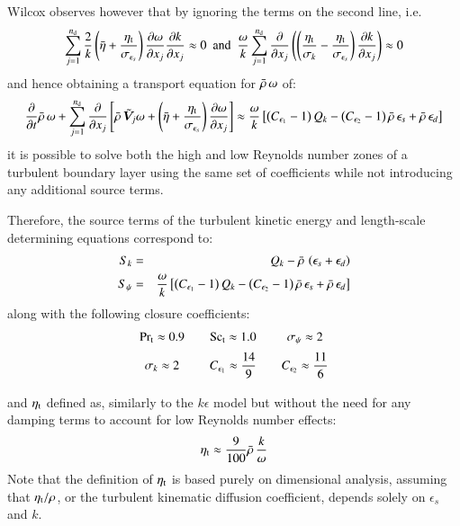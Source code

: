 \documentclass{warpdoc}
\newcommand{\alb}{\vspace{0.2cm}\\} %
\newcommand{\Sct}{{{\rm Sc}_{\rm t}}}
\newcommand{\Prt}{{{\rm Pr}_{\rm t}}}
\newcommand{\nd}{{{n}_{\rm d}}}
\newcommand{\turb}{_{\rm t}}
\newcommand{\etat}{{\eta\turb}}
\newcommand{\mfd}{\displaystyle}
\begin{document}
Wilcox\cite{turb:wilcox1988} observes however that by ignoring the terms on the second line,
i.e.
%
\begin{displaymath}
\sum_{j=1}^\nd \frac{2}{k}
\left(\wbar{\eta} +\frac{\etat}{\sigma_{\epsilon_s}} \right)
\frac{\partial \omega}{\partial x_j}    \frac{\partial k}{\partial x_j} \approx 0
{    \rm ~~and~~      }
   \mfd\frac{\omega}{k}
     \sum_{j=1}^{\nd} \frac{\partial }{\partial x_j}
     \left( \left( \frac{\etat}{\sigma_k}-\frac{\etat}{\sigma_{\epsilon_s}} \right) \frac{\partial k}{\partial x_j} \right) \approx 0
\end{displaymath}
%
and hence obtaining a transport equation for $\bar{\rho}\, \omega$ of:
%
\begin{equation}
    \frac{\partial }{\partial t}\wbar{\rho}\,\omega+\sum_{j=1}^\nd \frac{\partial}{\partial x_j}
            \left[
                \wbar{\rho}\, {\wtilde{\bm{V}}_j} \omega
               +\left( \wbar{\eta} +\frac{\etat}{\sigma_{\epsilon_s}} \right)\frac{\partial \omega}{\partial x_j}
            \right]
       \approx  \frac{\omega}{k}
         \left[
            \left(C_{\epsilon_1}-1\right) Q_k
           -\left(C_{\epsilon_2}-1\right) \wbar{\rho}\, \epsilon_s
           +\wbar{\rho}\, \epsilon_d
         \right]
  \label{eqn:SPDR:modeled:5}
\end{equation}
%
it is possible to solve both the high and low Reynolds number
zones of a turbulent boundary layer using the same set of
coefficients while not introducing any additional source terms.

Therefore, the source terms of the turbulent kinetic energy and length-scale
determining equations correspond to:
%
\begin{eqnarray}
  S_k&=&Q_k - \wbar{\rho}\, \left( \epsilon_s+\epsilon_d \right) \alb
  S_\psi&=&\frac{\omega}{k}
         \left[
            \left(C_{\epsilon_1}-1\right) Q_k
           -\left(C_{\epsilon_2}-1\right) \wbar{\rho}\, \epsilon_s
           +\wbar{\rho}\, \epsilon_d
         \right]
\end{eqnarray}
%
along with the following closure coefficients:
%
\begin{equation}
 \begin{array}{ccccc}
   \Prt \approx 0.9 &   & \Sct \approx 1.0 &   & \sigma_\psi \approx 2 \alb
   \sigma_k \approx 2 &   & \mfd C_{\epsilon_1} \approx \frac{14}{9}  &   & \mfd C_{\epsilon_2} \approx \frac{11}{6} \alb
 \end{array}
\end{equation}
%
and $\etat$ defined as, similarly to the $k\epsilon$ model but without
the need for any damping terms to account for low Reynolds number effects:
%
\begin{equation}
   \etat\approx\frac{9}{100} \wbar{\rho}\, \frac{k}{\omega}
\end{equation}
%
Note that the definition of $\etat$ is based purely on dimensional
analysis, assuming that $\etat/\rho$, or the turbulent kinematic
diffusion coefficient, depends solely on $\epsilon_s$ and $k$.
\end{document}
